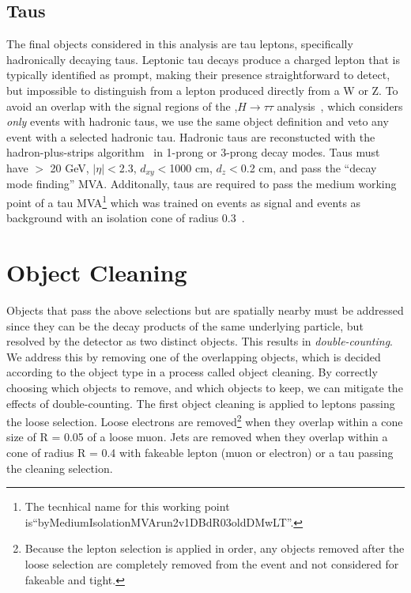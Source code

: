 \subsection{Taus}
The final objects considered in this analysis are tau leptons, specifically hadronically decaying taus. Leptonic tau decays produce a charged lepton that is typically identified as prompt,
making their presence straightforward to detect, but impossible to distinguish from a lepton produced directly from a W or Z. To avoid an overlap with the signal regions of the \tth,$H\rightarrow\tau\tau$
analysis~\cite{CMS-PAS-HIG-17-003}, which considers \emph{only} events with hadronic taus, we use the same object definition and veto any event with a selected hadronic tau. Hadronic taus are
reconstucted with the hadron-plus-strips algorithm~\cite{hps} in 1-prong or 3-prong decay modes. Taus must have \pt $>$ 20 GeV, $|\eta|<$2.3, $d_{xy}<$1000 cm, $d_{z}<$0.2 cm, and pass the
``decay mode finding'' MVA. Additonally, taus are required to pass the medium working point of a tau MVA\footnote{The tecnhical name for this working point is``byMediumIsolationMVArun2v1DBdR03oldDMwLT''.}
which was trained on \tth events as signal and \ttbar events as background with an isolation cone of radius 0.3~\cite{CMS-AN-15-310}. 

\section{Object Cleaning}
\label{sec:cleaning}
Objects that pass the above selections but are spatially nearby must be addressed since they can be
the decay products of the same underlying particle, but resolved by the detector as two distinct objects. This results in \emph{double-counting}.
We address this by removing one of the overlapping objects, which is decided according to the object type in a process called object cleaning. By correctly choosing which objects to remove, and which objects to keep,
we can mitigate the effects of double-counting. The first object cleaning is applied to leptons passing the loose selection. Loose electrons are removed\footnote{Because the lepton selection is applied in
order, any objects removed after the loose selection are completely removed from the event and not considered for fakeable and tight.} when they overlap within a cone size of R = 0.05 of a loose muon. 
Jets are removed when they overlap within a cone of radius R = 0.4 with fakeable lepton (muon or electron) or a tau passing the cleaning selection.
